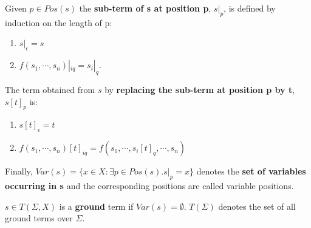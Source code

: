 \begin{definition}
Given $p \in Pos(s)$ the \textbf{sub-term of s at position p}, $s|_p$, is defined by induction on the length of p:

\begin{enumerate}
\item $s|_\epsilon = s$
\item $f(s_1,\cdots,s_n)|_{iq} = s_i|_q$. 
\end{enumerate}

The term obtained from $s$ by \textbf{replacing the sub-term at position p by t}, $s[t]_p$ is:

\begin{enumerate}
\item $s[t]_\epsilon = t$
\item $f(s_1,\cdots,s_n)[t]_{iq} = f(s_1,\cdots,s_i[t]_q,\cdots,s_n)$
\end{enumerate}

Finally, $Var(s) = \{x \in X:\exists p \in Pos(s).s|_p = x\}$ denotes the \textbf{set of variables occurring in s} and the corresponding positions are called variable positions.
\end{definition}

\begin{definition}
$s \in T(\Sigma,X)$ is a \textbf{ground} term if $Var(s) = \emptyset$. $T(\Sigma)$ denotes the set of all ground terms over $\Sigma$.
\end{definition}

